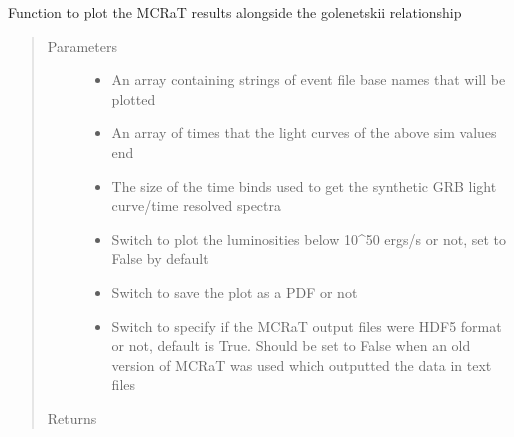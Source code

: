 \documentclass[letterpaper,10pt,english]{sphinxmanual}
\begin{document}

\begin{fulllineitems}
\label{\detokenize{read_process_files:read_process_files.plot_golenetskii}}
Function to plot the MCRaT results alongside the golenetskii relationship
\begin{quote}\begin{description}
\item[{Parameters}] \leavevmode\begin{itemize}
\item {} 
 \textendash{} An array containing strings of event file base names that will be plotted

\item {} 
 \textendash{} An array of times that the light curves of the above sim values end

\item {} 
 \textendash{} The size of the time binds used to get the synthetic GRB light curve/time resolved spectra

\item {} 
 \textendash{} Switch to plot the luminosities below 10\textasciicircum{}50 ergs/s or not, set to False by default

\item {} 
 \textendash{} Switch to save the plot as a PDF or not

\item {} 
 \textendash{} Switch to specify if the MCRaT output files were HDF5 format or not, default is True. Should be set to
False when an old version of MCRaT was used which outputted the data in text files

\end{itemize}

\item[{Returns}] \leavevmode


\end{description}\end{quote}

\end{fulllineitems}
\end{document}
